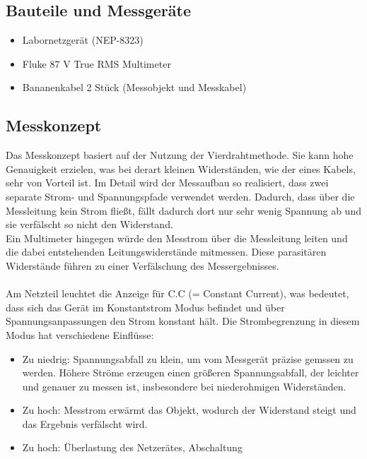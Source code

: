 \documentclass[a4paper,12pt]{article}
\begin{document}
\subsection{Bauteile und Messgeräte}
\begin{itemize}
\item Labornetzgerät (NEP-8323)
\item Fluke 87 V True RMS Multimeter
\item Bananenkabel 2 Stück (Messobjekt und Messkabel)
\end{itemize}

\subsection{Messkonzept}
Das Messkonzept basiert auf der Nutzung der Vierdrahtmethode. Sie kann hohe Genauigkeit erzielen, was bei derart kleinen Widerständen, wie der eines Kabels, sehr von Vorteil ist. Im Detail wird der Messaufbau so realisiert, dass zwei separate Strom- und Spannungspfade verwendet werden. Dadurch, dass über die Messleitung kein Strom fließt, fällt dadurch dort nur sehr wenig Spannung ab und sie verfälscht so nicht den Widerstand.\\
\noindent Ein Multimeter hingegen würde den Messtrom über die Messleitung leiten und die dabei entstehenden Leitungswiderstände mitmessen. Diese parasitären Widerstände führen zu einer Verfälschung des Messergebnisses. \\\\
\noindent Am Netzteil leuchtet die Anzeige für C.C (= Constant Current), was bedeutet, dass sich das Gerät im Konstantstrom Modus befindet und über Spannungsanpassungen den Strom konstant hält. Die Strombegrenzung in diesem Modus hat verschiedene Einflüsse:
\begin{itemize}
\item Zu niedrig: Spannungsabfall zu klein, um vom Messgerät präzise gemssen zu werden. Höhere Ströme erzeugen einen größeren Spannungsabfall, der leichter und genauer zu messen ist, insbesondere bei niederohmigen Widerständen.
\item Zu hoch: Messtrom erwärmt das Objekt, wodurch der Widerstand steigt und das Ergebnis verfälscht wird.
\item Zu hoch: Überlastung des Netzerätes, Abschaltung\\
\end{itemize}
\newpage
{}
\end{document}
